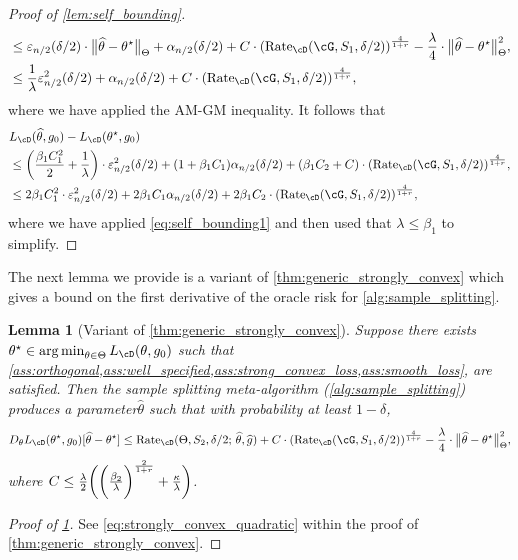 \documentclass[11pt]{article} %
\newcommand{\pref}[1]{\cref{#1}}
\newcommand{\pfref}[1]{Proof of \pref{#1}}
\theoremstyle{theorem}  %
\newtheorem{lemma}{Lemma}
\theoremstyle{plain}
\DeclarePairedDelimiter{\prn}{(}{)}
\DeclarePairedDelimiter{\nrm}{\|}{\|}
\DeclareMathOperator*{\argmin}{arg\,min} %
\newcommand{\veps}{\varepsilon}
\newcommand{\wh}[1]{\widehat{#1}}
\newcommand{\midsem}{;\,}
\newcommand{\poprisk}{L_{\cD}}
\newcommand{\estone}{\wh{g}}
\newcommand{\esttwo}{\wh{\theta}}
\newcommand{\nuisance}{\cG}
\newcommand{\target}{\Theta}
\newcommand{\Rate}{\mathrm{Rate}_{\cD}}
\newcommand{\besttwo}{\theta^{\star}}
\newcommand{\gtone}{g_0}
\newcommand{\sampleone}{S_1}
\newcommand{\sampletwo}{S_2}
\newcommand{\param}{parameter\xspace}
\begin{document}
\begin{proof}[\pfref{lem:self_bounding}]
\begin{align*}
     &\leq{}
           \veps_{n/2}(\delta/2)\cdot{}\nrm[\big]{\esttwo-\besttwo}_{\target}
    + \alpha_{n/2}(\delta/2)
+
 C \cdot{}\prn*{
\Rate(\nuisance,\sampleone,\delta/2)
}^{\frac{4}{1+r}}
       -\frac{\lambda}{4}\cdot{}\nrm[\big]{\esttwo-\besttwo}_{\target}^{2}, \\
            &\leq{}
              \frac{1}{\lambda}\veps^2_{n/2}(\delta/2)
    + \alpha_{n/2}(\delta/2)
+
 C \cdot{}\prn*{
\Rate(\nuisance,\sampleone,\delta/2)
}^{\frac{4}{1+r}},
   \end{align*}
              where we have applied the AM-GM inequality. It follows
              that
              \begin{align*}
                &L_{\cD}(\esttwo,\gtone) - L_{\cD}(\besttwo, \gtone) \\
                &\leq{} \prn*{\frac{\beta_1C_1^2}{2}+\frac{1}{\lambda}}\cdot{}\veps^2_{n/2}(\delta/2) + (1+\beta_1C_1)\alpha_{n/2}(\delta/2)+
(\beta_1C_2+C)\cdot{}\prn*{
\Rate(\nuisance,\sampleone,\delta/2)
                  }^{\frac{4}{1+r}}, \\
                                &\leq{} 2\beta_1C_1^2\cdot{}\veps^2_{n/2}(\delta/2) + 2\beta_1C_1\alpha_{n/2}(\delta/2)+
2\beta_1C_2\cdot{}\prn*{
\Rate(\nuisance,\sampleone,\delta/2)
}^{\frac{4}{1+r}},
              \end{align*}
              where we have applied \pref{eq:self_bounding1} and then used
              that $\lambda\leq{}\beta_1$ to simplify.
\end{proof}

The next lemma we provide is a variant of
\pref{thm:generic_strongly_convex} which gives a bound on the first
derivative of the oracle risk for \pref{alg:sample_splitting}.

\begin{lemma}[Variant of \pref{thm:generic_strongly_convex}]
\label{lem:first_order_bound}
Suppose there exists
$\besttwo\in\argmin_{\theta\in\target}\poprisk(\theta,\gtone)$ such
that
\pref{ass:orthogonal,ass:well_specified,ass:strong_convex_loss,ass:smooth_loss},
are satisfied. Then the sample splitting meta-algorithm
(\pref{alg:sample_splitting}) produces a \param $\esttwo$ such that
with probability at least $1-\delta$,
\begin{equation}
  \label{eq:first_order_bound}
D_{\theta}L_{\cD}(\besttwo,\gtone)[\esttwo-\besttwo] \leq{}  
 \Rate(\target,\sampletwo,\delta/2\midsem{}\esttwo,\estone) +
 C \cdot{}\prn*{
\Rate(\nuisance,\sampleone,\delta/2)
}^{\frac{4}{1+r}}
 -\frac{\lambda}{4}\cdot{}\nrm[\big]{\esttwo-\besttwo}_{\target}^{2},
\end{equation}
where $C\leq{} \frac{\lambda}{2}\prn[\bigg]{\prn[\bigg]{\frac{\beta_2}{\lambda}}^{\frac{2}{1+r}} + \frac{\kappa}{\lambda}}$.
%
%
%
%
%
%
%
%
%
%
%
%
%
%
%
%
%
%
%
%
%
%
%
%
%
%
%
%
%
%
\end{lemma}
\begin{proof}[\pfref{lem:first_order_bound}]
See \pref{eq:strongly_convex_quadratic} within the proof of \pref{thm:generic_strongly_convex}.
\end{proof}
\end{document}
